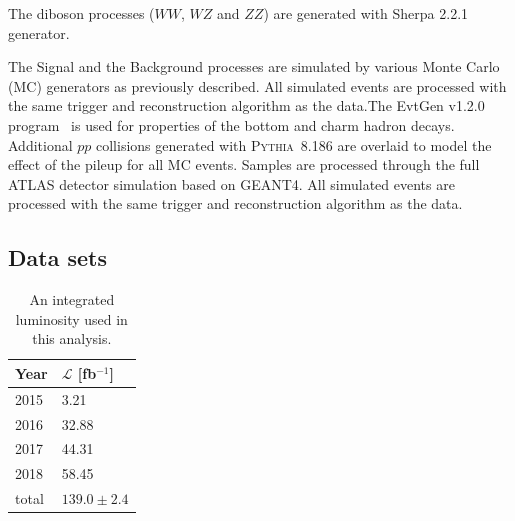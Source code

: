 The diboson processes ($WW$, $WZ$ and $ZZ$) are generated with Sherpa 2.2.1~\cite{Gleisberg:2008ta} generator.

The Signal and the Background processes are simulated by various Monte Carlo (MC) generators as previously described. 
All simulated events are processed with the same trigger and reconstruction algorithm as the data.The EvtGen v1.2.0 program~\cite{Lange:2001uf} is used for properties of the bottom and charm hadron decays.
Additional $pp$ collisions generated with \textsc{Pythia}~8.186\cite{Sjostrand:2008vc} are overlaid to model the effect of the pileup for all MC events.
Samples are processed through the full ATLAS detector simulation\cite{SOFT-2010-01} based on \textsc{GEANT4}\cite{Agostinelli:2002hh}.
All simulated events are processed with the same trigger and reconstruction algorithm as the data.

\subsection{Data sets}

\begin{table}[htb!p]
\label{tab:intLumi}
\begin{center}
\begin{tabular}{|l|l|}
\hline
Year & $\mathcal{L}$ [fb$^{-1}$] \\
\hline\hline
2015 & 3.21 \\
\hline
2016 & 32.88 \\
\hline
2017 & 44.31 \\
\hline
2018 & 58.45 \\
\hline\hline
total & $139.0 \pm 2.4$ \\
\hline
\end{tabular}
\end{center}
\caption{An integrated luminosity used in this analysis. }
\end{table}




